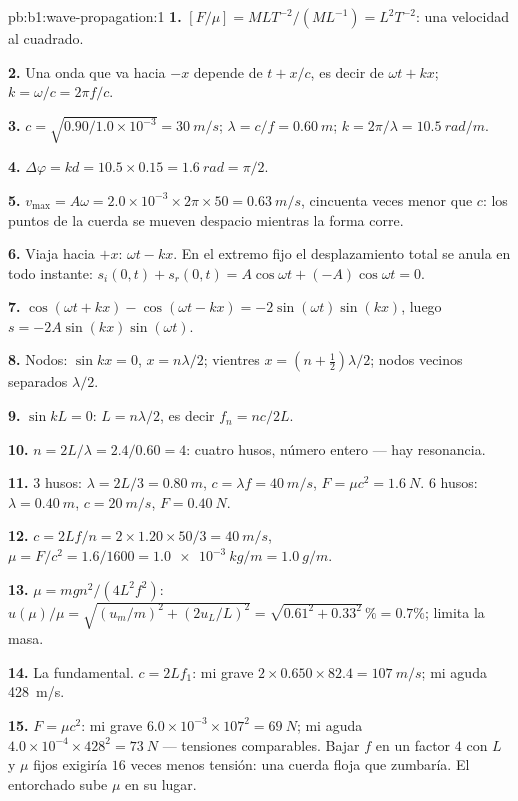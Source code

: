 \begin{solution}{pb:b1:wave-propagation:1}
\textbf{1.} $[F/\mu] = M L T^{-2}/(M L^{-1}) = L^2 T^{-2}$: una velocidad
al cuadrado.

\textbf{2.} Una onda que va hacia $-x$ depende de $t + x/c$, es decir de
$\omega t + kx$; $k = \omega/c = 2\pi f/c$.

\textbf{3.} $c = \sqrt{0.90/1.0\times10^{-3}} = \qty{30}{m/s}$;
$\lambda = c/f = \qty{0.60}{m}$; $k = 2\pi/\lambda = \qty{10.5}{rad/m}$.

\textbf{4.} $\Delta\varphi = kd = 10.5 \times 0.15 = \qty{1.6}{rad} = \pi/2$.

\textbf{5.} $v_{\max} = A\omega = 2.0\times10^{-3} \times 2\pi \times 50 =
\qty{0.63}{m/s}$, cincuenta veces menor que $c$: los puntos de la cuerda
se mueven despacio mientras la forma corre.

\textbf{6.} Viaja hacia $+x$:  $\omega t - kx$. En el extremo fijo el
desplazamiento total se anula en todo instante: $s_i(0, t) + s_r(0, t)
= A\cos\omega t + (-A)\cos\omega t = 0$.

\textbf{7.} $\cos(\omega t + kx) - \cos(\omega t - kx) =
-2\sin(\omega t)\sin(kx)$, luego $s = -2A\sin(kx)\sin(\omega t)$.

\textbf{8.} Nodos: $\sin kx = 0$, $x = n\lambda/2$; vientres $x = (n +
\tfrac12)\lambda/2$; nodos vecinos separados $\lambda/2$.

\textbf{9.} $\sin kL = 0$: $L = n\lambda/2$, es decir $f_n = nc/2L$.

\textbf{10.} $n = 2L/\lambda = 2.4/0.60 = 4$: cuatro husos, número entero
--- hay resonancia.

\textbf{11.} $3$ husos: $\lambda = 2L/3 = \qty{0.80}{m}$, $c = \lambda f
= \qty{40}{m/s}$, $F = \mu c^2 = \qty{1.6}{N}$. $6$ husos: $\lambda =
\qty{0.40}{m}$, $c = \qty{20}{m/s}$, $F = \qty{0.40}{N}$.

\textbf{12.} $c = 2Lf/n = 2 \times 1.20 \times 50/3 = \qty{40}{m/s}$,
$\mu = F/c^2 = 1.6/1600 = \qty{1.0e-3}{kg/m} = \qty{1.0}{g/m}$.

\textbf{13.} $\mu = mgn^2/(4L^2f^2)$: $u(\mu)/\mu = \sqrt{(u_m/m)^2 +
(2u_L/L)^2} = \sqrt{0.61^2 + 0.33^2}\,\% = 0.7\%$; limita la masa.

\textbf{14.} La fundamental. $c = 2Lf_1$: mi grave $2 \times 0.650 \times
82.4 = \qty{107}{m/s}$; mi aguda \qty{428}{m/s}.

\textbf{15.} $F = \mu c^2$: mi grave $6.0\times10^{-3} \times 107^2 =
\qty{69}{N}$; mi aguda $4.0\times10^{-4} \times 428^2 = \qty{73}{N}$ ---
tensiones comparables. Bajar $f$ en un factor $4$ con $L$ y $\mu$ fijos
exigiría $16$ veces menos tensión: una cuerda floja que zumbaría. El
entorchado sube $\mu$ en su lugar.


\end{solution}
